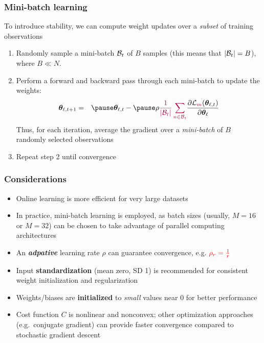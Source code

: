 \documentclass[smaller]{beamer}
\begin{document}
\begin{frame}
  \frametitle{Mini-batch learning}
  \pause
  To introduce stability, we can compute weight updates over a \textit{\pl subset} of training observations

  \begin{enumerate}[<+->]
  \item Randomly sample a mini-batch $\mathcal{B}_{t}$ of $B$ samples (this means that $|\mathcal{B}_{t}|=B$), where $B \ll N$.
  \item Perform a forward and backward pass through each mini-batch to update the weights:\pause
      \begin{eqnarray}
    \bm\th_{\ell, t+1}  &=& \pause  \bm\th_{\ell,t} - \pause \rho{\pl  \fr1{|\mc{B}_{t}|} \sum_{n\in\mc{B}_{t}}} \pd{\mc{L}_{\pl m}(\bm \th_{\ell,t})}{\bm\th_{\ell}} 
  \end{eqnarray}
  \pause
  Thus, for each iteration, average the gradient over a \textit{\pl mini-batch} of $B$ randomly selected observations
\item Repeat step 2 until convergence
  \end{enumerate}  
\end{frame}

\begin{frame}
  \frametitle{Considerations}
  \pause
  \begin{itemize}[<+->]
  \item Online learning is more efficient for very large datasets
  \item In practice, mini-batch learning is employed, as batch sizes (usually, $M=16$ or $M=32$) can be chosen to take advantage of parallel computing architectures
  \item An \textit{\bf \rd adpative} learning rate $\rho$ can guarantee convergence, e.g. $\color{red} \rho_r = \frac1r$
  

  \item Input \textbf{standardization} (mean zero, SD 1) is recommended for consistent weight initialization and regularization
  \item Weights/biases are \textbf{initialized} to \textit{small} values near 0 for better performance
  \item Cost function $C$ is nonlinear and nonconvex; other optimization approaches (e.g.\ conjugate gradient) can
    provide faster convergence compared to stochastic gradient descent
  \end{itemize}
\end{frame}
\end{document}

